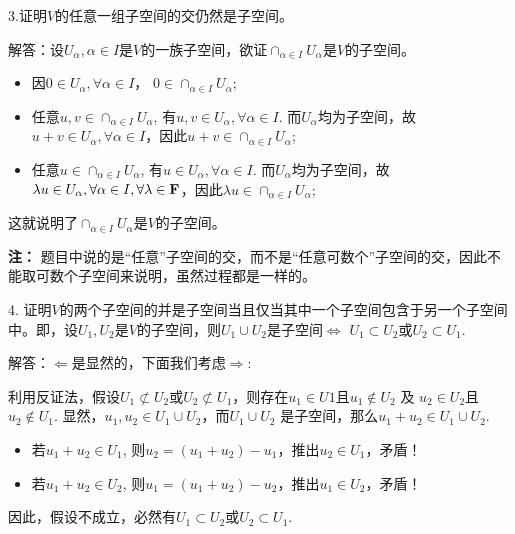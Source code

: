 \documentclass[hyperref,]{ctexart}
\providecommand{\tightlist}{%
  \setlength{\itemsep}{0pt}\setlength{\parskip}{0pt}}
\begin{document}
\bigskip

\noindent{} 3.证明\(V\)的任意一组子空间的交仍然是子空间。

\noindent{}
解答：设\(U_{\alpha},\alpha\in I\)是\(V\)的一族子空间，欲证\(\cap_{\alpha\in I}U_{\alpha}\)是\(V\)的子空间。

\begin{itemize}
\tightlist
\item
  因\(0\in U_{\alpha},\forall \alpha\in I\)，
  \(0\in \cap_{\alpha\in I}U_{\alpha}\);
\item
  任意\(u,v\in \cap_{\alpha\in I}U_{\alpha}\),
  有\(u,v\in U_{\alpha},\forall \alpha\in I\).
  而\(U_{\alpha}\)均为子空间，故\(u+v\in U_{\alpha},\forall \alpha\in I\)，因此\(u+v \in \cap_{\alpha\in I}U_{\alpha}\);
\item
  任意\(u\in \cap_{\alpha\in I}U_{\alpha}\),
  有\(u\in U_{\alpha},\forall \alpha\in I\).
  而\(U_{\alpha}\)均为子空间，故\(\lambda u\in U_{\alpha},\forall \alpha\in I,\forall \lambda \in \mathbf{F}\)，因此\(\lambda u \in \cap_{\alpha\in I}U_{\alpha}\);
\end{itemize}

这就说明了\(\cap_{\alpha\in I}U_{\alpha}\)是\(V\)的子空间。

\noindent{} \textbf{注：}
题目中说的是``任意''子空间的交，而不是``任意可数个''子空间的交，因此不能取可数个子空间来说明，虽然过程都是一样的。

\bigskip

\noindent{} 4.
证明\(V\)的两个子空间的并是子空间当且仅当其中一个子空间包含于另一个子空间中。即，设\(U_1,U_2\)是\(V\)的子空间，则\(U_1\cup U_2\)是子空间\(\iff\)
\(U_1\subset U_2\)或\(U_2\subset U_1\).

\noindent{}解答：\(\Leftarrow\)是显然的，下面我们考虑\(\Rightarrow\):

利用反证法，假设\(U_1\not\subset U_2\)或\(U_2\not\subset U_1\)，则存在\(u_1\in U1\)且\(u_1\notin U_2\)
及 \(u_2 \in U_2\)且\(u_2\notin U_1\).
显然，\(u_1,u_2\in U_1\cup U_2\)，而\(U_1\cup U_2\)
是子空间，那么\(u_1+u_2 \in U_1\cup U_2\).

\begin{itemize}
\tightlist
\item
  若\(u_1+u_2 \in U_1\),
  则\(u_2 = (u_1+u_2)-u_1\)，推出\(u_2\in U_1\)，矛盾！
\item
  若\(u_1+u_2 \in U_2\),
  则\(u_1 = (u_1+u_2)-u_2\)，推出\(u_1\in U_2\)，矛盾！
\end{itemize}

因此，假设不成立，必然有\(U_1\subset U_2\)或\(U_2\subset U_1\).
\end{document}
